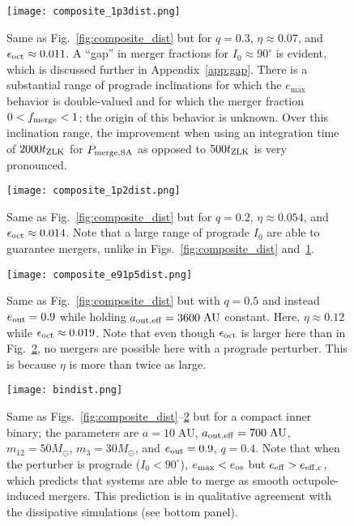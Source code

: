 \documentclass[
        fleqn,
        usenatbib,
    ]{mnras}
\newlength{\colummwidth}
\begin{document}
\begin{figure}
    \centering
    \texttt{[image: composite\_1p3dist.png]}
    \caption{Same as Fig.~\ref{fig:composite_dist} but for $q = 0.3$, $\eta
    \approx 0.07$, and $\epsilon_{\rm oct} \approx 0.011$. A ``gap'' in merger
    fractions for $I_0 \approx 90^\circ$ is evident, which is discussed further
    in Appendix~\ref{app:gap}. There is a substantial range of prograde
    inclinations for which the $e_{\max}$ behavior is double-valued and for
    which the merger fraction $0 < f_{\rm merge} < 1$; the origin of this
    behavior is unknown. Over this inclination range, the improvement when using
    an integration time of $2000 t_{\rm ZLK}$ for $P_{\rm merge, SA}$ as opposed
    to $500 t_{\rm ZLK}$ is very pronounced. }\label{fig:composite_1p3}
\end{figure}
\begin{figure}
    \centering
    \texttt{[image: composite\_1p2dist.png]}
    \caption{Same as Fig.~\ref{fig:composite_dist} but for $q = 0.2$, $\eta
    \approx 0.054$, and $\epsilon_{\rm oct} \approx 0.014$. Note that a large
    range of prograde $I_0$ are able to guarantee mergers, unlike in
    Figs.~\ref{fig:composite_dist} and~\ref{fig:composite_1p3}.
    }\label{fig:composite_1p2}
\end{figure}
\begin{figure}
    \centering
    \texttt{[image: composite\_e91p5dist.png]}
    \caption{Same as Fig.~\ref{fig:composite_dist} but with $q = 0.5$ and
    instead $e_{\rm out} = 0.9$ while holding $a_{\rm out, eff} =
    3600\;\mathrm{AU}$ constant. Here, $\eta \approx 0.12$ while $\epsilon_{\rm
    oct} \approx 0.019$. Note that even though $\epsilon_{\rm oct}$ is larger
    here than in Fig.~\ref{fig:composite_1p2}, no mergers are possible here with
    a prograde perturber. This is because $\eta$ is more than twice as large.
    }\label{fig:composite_e91p5}
\end{figure}
\begin{figure}
    \centering
    \texttt{[image: bindist.png]}
    \caption{Same as Figs.~\ref{fig:composite_dist}--\ref{fig:composite_1p2}
    but for a compact inner binary; the parameters are $a = 10\;\mathrm{AU}$,
    $a_{\rm out, eff} = 700\;\mathrm{AU}$, $m_{12} = 50M_{\odot}$, $m_3 =
    30M_{\odot}$, and $e_{\rm out} = 0.9$, $q = 0.4$. Note that when the
    perturber is prograde ($I_0 < 90^\circ$), $e_{\max} <
    e_{\rm os}$ but $e_{\rm eff} > e_{\rm eff, c}$, which predicts that systems
    are able to merge as smooth octupole-induced mergers. This prediction is
    in qualitative agreement with the dissipative simulations (see bottom
    panel). }\label{fig:composite_bindist}
\end{figure}
\end{document}
